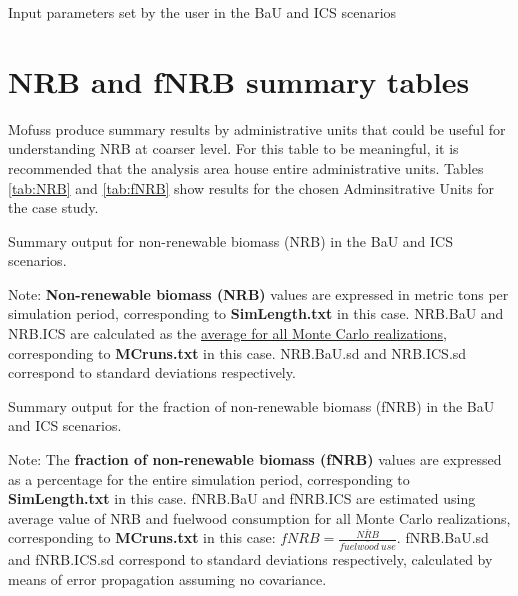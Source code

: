 \documentclass[english,a4paper,11pt,twoside]{report}
\begin{document}
\begin{table}[H]
	\centering
	\caption{Input parameters set by the user in the BaU and ICS scenarios }
	\label{tab:Input Par}
\end{table}

\pagebreak
\section{NRB and fNRB summary tables} \label{sec:NRB}
Mofuss produce summary results by administrative units that could be useful for understanding NRB at coarser level. For this table to be meaningful, it is recommended that the analysis area house entire administrative units. Tables \ref{tab:NRB} and \ref{tab:fNRB} show results for the chosen Adminsitrative Units for the  case study.

\begin{table}[H]
	\centering
	\caption{Summary output for non-renewable biomass (NRB) in the BaU and ICS scenarios.}
	\large 
	\label{tab:NRB}
	\begin{flushleft}
	{\small Note: \textbf{Non-renewable biomass (NRB)} values are expressed in metric tons per simulation period, corresponding to \textbf{ {SimLength.txt}} in this case. NRB.BaU and NRB.ICS are calculated as the \underline{average for all Monte Carlo realizations}, corresponding to \textbf{ {MCruns.txt}} in this case. NRB.BaU.sd and NRB.ICS.sd correspond to standard deviations respectively.%
	}
	\end{flushleft}
\end{table}
\begin{table}[H]
	\centering
	\caption{Summary output for the fraction of non-renewable biomass (fNRB) in the BaU and ICS scenarios.}
	\large
	\label{tab:fNRB}
	\csvautotabular{fNRBTable.csv}
	\begin{flushleft}
	{\small Note: The \textbf{fraction of non-renewable biomass (fNRB)} values are expressed as a percentage for the entire simulation period, corresponding to \textbf{ {SimLength.txt}} in this case. fNRB.BaU and fNRB.ICS are estimated using average value of NRB and fuelwood consumption for all Monte Carlo realizations, corresponding to \textbf{ {MCruns.txt}} in this case: $ fNRB=\frac{\bar{NRB}}{\bar{fuelwood\:use}} $. fNRB.BaU.sd and fNRB.ICS.sd correspond to standard deviations respectively, calculated by means of error propagation assuming no covariance.%
	}
	\end{flushleft}
	\end{table}
\bigskip
\bigskip
\bigskip
\bigskip
\bigskip
\bigskip
\bigskip
\bigskip
\end{document}
